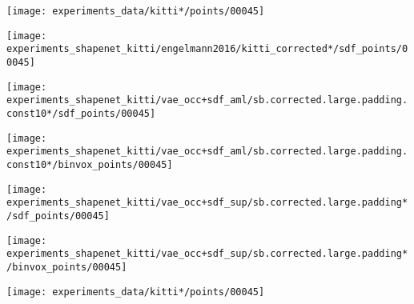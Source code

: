 \begin{minipage}[t]{0.1\textwidth}
    \vspace{0px}
    \centering
    \texttt{[image: experiments\_data/kitti*/points/00045]}
\end{minipage}
\begin{minipage}[t]{0.09\textwidth}
    \vspace{0px}
    \centering
\end{minipage}
\begin{minipage}[t]{0.1\textwidth}
    \vspace{0px}
    \centering
    \texttt{[image: experiments\_shapenet\_kitti/engelmann2016/kitti\_corrected*/sdf\_points/00045]}
\end{minipage}
\begin{minipage}[t]{0.1\textwidth}
    \vspace{0px}
    \centering
    \texttt{[image: experiments\_shapenet\_kitti/vae\_occ+sdf\_aml/sb.corrected.large.padding.const10*/sdf\_points/00045]}
\end{minipage}
\begin{minipage}[t]{0.1\textwidth}
    \vspace{0px}
    \centering
    \texttt{[image: experiments\_shapenet\_kitti/vae\_occ+sdf\_aml/sb.corrected.large.padding.const10*/binvox\_points/00045]}
\end{minipage}
\begin{minipage}[t]{0.1\textwidth}
    \vspace{0px}
    \centering
    \texttt{[image: experiments\_shapenet\_kitti/vae\_occ+sdf\_sup/sb.corrected.large.padding*/sdf\_points/00045]}
\end{minipage}
\begin{minipage}[t]{0.1\textwidth}
    \vspace{0px}
    \centering
    \texttt{[image: experiments\_shapenet\_kitti/vae\_occ+sdf\_sup/sb.corrected.large.padding*/binvox\_points/00045]}
\end{minipage}
\begin{minipage}[t]{0.1\textwidth}
    \vspace{0px}
    \centering
    \texttt{[image: experiments\_data/kitti*/points/00045]}
\end{minipage}

